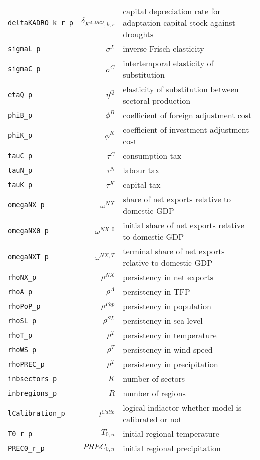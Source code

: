 \begin{center}
\begin{longtable}{lrl}
\texttt{deltaKADRO\_k\_r\_p} & ${\delta_{K^{A,DRO},k,r}}$ & capital depreciation rate for adaptation capital stock against droughts\\
\texttt{sigmaL\_p} & ${\sigma^{L}}$ & inverse Frisch elasticity\\
\texttt{sigmaC\_p} & ${\sigma^{C}}$ & intertemporal elasticity of substitution\\
\texttt{etaQ\_p} & ${\eta^{Q}}$ & elasticity of substitution between sectoral production\\
\texttt{phiB\_p} & ${\phi^{B}}$ & coefficient of foreign adjustment cost\\
\texttt{phiK\_p} & ${\phi^{K}}$ & coefficient of investment adjustment cost\\
\texttt{tauC\_p} & ${\tau^{C}}$ & consumption tax\\
\texttt{tauN\_p} & ${\tau^{N}}$ & labour tax\\
\texttt{tauK\_p} & ${\tau^{K}}$ & capital tax\\
\texttt{omegaNX\_p} & ${\omega^{NX}}$ & share of net exports relative to domestic GDP\\
\texttt{omegaNX0\_p} & ${\omega^{NX,0}}$ & initial share of net exports relative to domestic GDP\\
\texttt{omegaNXT\_p} & ${\omega^{NX,T}}$ & terminal share of net exports relative to domestic GDP\\
\texttt{rhoNX\_p} & ${\rho^{NX}}$ & persistency in net exports\\
\texttt{rhoA\_p} & ${\rho^{A}}$ & persistency in TFP\\
\texttt{rhoPoP\_p} & ${\rho^{Pop}}$ & persistency in population\\
\texttt{rhoSL\_p} & ${\rho^{SL}}$ & persistency in sea level\\
\texttt{rhoT\_p} & ${\rho^{T}}$ & persistency in temperature\\
\texttt{rhoWS\_p} & ${\rho^{T}}$ & persistency in wind speed\\
\texttt{rhoPREC\_p} & ${\rho^{T}}$ & persistency in precipitation\\
\texttt{inbsectors\_p} & ${K}$ & number of sectors\\
\texttt{inbregions\_p} & ${R}$ & number of regions\\
\texttt{lCalibration\_p} & ${l^{Calib}}$ & logical indiactor whether model is calibrated or not\\
\texttt{T0\_r\_p} & ${T_{0,n}}$ & initial regional temperature\\
\texttt{PREC0\_r\_p} & ${PREC_{0,n}}$ & initial regional precipitation\\

\end{longtable}
\end{center}
